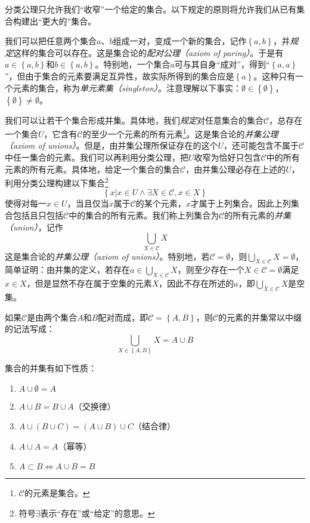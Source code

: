 \documentclass[../main.tex]{subfiles}
\begin{document}
分类公理只允许我们“收窄”一个给定的集合。以下规定的原则将允许我们从已有集合构建出“更大的”集合。

我们可以把任意两个集合$a$、$b$组成一对，变成一个新的集合，记作$\left\{a,b\right\}$，并\emph{规定}这样的集合可以存在。这是集合论的\emph{配对公理（axiom of paring）}。于是有$a\in \left\{a,b\right\}$和$b\in \left\{a,b\right\}$。特别地，一个集合$a$可与其自身“成对”，得到“$\left\{a,a\right\}$”，但由于集合的元素要满足互异性，故实际所得到的集合应是$\left\{a\right\}$。这种只有一个元素的集合，称为\emph{单元素集（singleton）}。注意理解以下事实：$\emptyset\in\left\{\emptyset\right\}$，$\left\{\emptyset\right\}\neq\emptyset$。

我们可以让若干个集合形成并集。具体地，我们\emph{规定}对任意集合的集合$\mathcal{C}$，总存在一个集合$U$，它含有$\mathcal{C}$的至少一个元素的所有元素\footnote{$\mathcal{C}$的元素是集合。}。这是集合论的\emph{并集公理（axiom of unions）}。但是，由并集公理所保证存在的这个$U$，还可能包含不属于$\mathcal{C}$中任一集合的元素。我们可以再利用分类公理，把$U$收窄为恰好只包含$\mathcal{C}$中的所有元素的所有元素。具体地，给定一个集合的集合$\mathcal{C}$，由并集公理必存在上述的$U$，利用分类公理构建以下集合\footnote{符号$\exists$表示“存在”或“给定”的意思。}
\begin{equation*}\label{eq:set_union}
    \left\{x|x\in U \wedge \exists X\in\mathcal{C},x\in X\right\}
\end{equation*}
使得对每一$x\in U$，当且仅当$x$属于$\mathcal{C}$的某个元素，$x$才属于上列集合。因此上列集合包括且只包括$\mathcal{C}$中的集合的所有元素。我们称上列集合为$\mathcal{C}$的所有元素的\emph{并集（union）}，记作
\[
    \bigcup_{X\in\mathcal{C}}X
\]
这是集合论的\emph{并集公理（axiom of unions）}。特别地，若$\mathcal{C}=\emptyset$，则$\bigcup_{X\in\mathcal{C}}X=\emptyset$，简单证明：由并集的定义，若存在$a\in\bigcup_{X\in\mathcal{C}}X$，则至少存在一个$X\in\mathcal{C}=\emptyset$满足$x\in X$，但是显然不存在属于空集的元素$X$，因此不存在所述的$a$，即$\bigcup_{X\in\mathcal{C}}X$是空集。

如果$\mathcal{C}$是由两个集合$A$和$B$配对而成，即$\mathcal{C}=\left\{A,B\right\}$，则$\mathcal{C}$的元素的并集常以中缀的记法写成：
\[
    \bigcup_{X\in\left\{A,B\right\}}X= A\cup B
\]

集合的并集有如下性质：

\begin{enumerate}
    \item $A\cup \emptyset=A$
    \item $A\cup B=B\cup A$（交换律）
    \item $A\cup\left(B\cup C\right)=\left(A\cup B\right)\cup C$（结合律）
    \item $A\cup A=A$（幂等）
    \item $A\subset B\Leftrightarrow A\cup B=B$
\end{enumerate}
\end{document}
